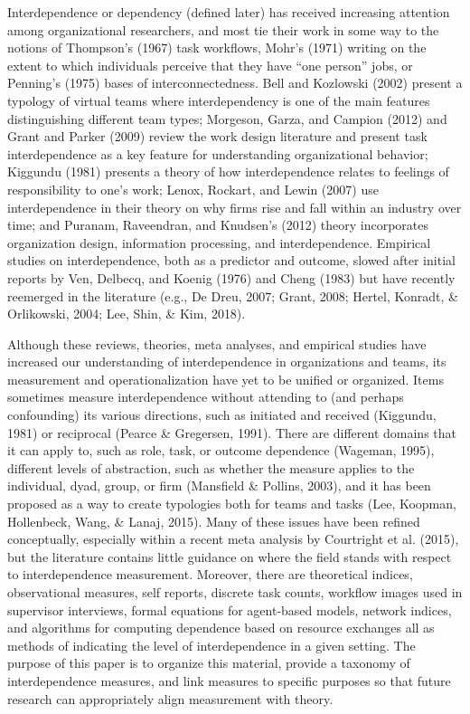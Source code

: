 \documentclass[english,,man]{apa6}
\theoremstyle{definition}
\theoremstyle{definition}
\theoremstyle{definition}
\theoremstyle{remark}
\begin{document}
Interdependence or dependency (defined later) has received increasing
attention among organizational researchers, and most tie their work in
some way to the notions of Thompson's (1967) task workflows, Mohr's
(1971) writing on the extent to which individuals perceive that they
have \enquote{one person} jobs, or Penning's (1975) bases of
interconnectedness. Bell and Kozlowski (2002) present a typology of
virtual teams where interdependency is one of the main features
distinguishing different team types; Morgeson, Garza, and Campion (2012)
and Grant and Parker (2009) review the work design literature and
present task interdependence as a key feature for understanding
organizational behavior; Kiggundu (1981) presents a theory of how
interdependence relates to feelings of responsibility to one's work;
Lenox, Rockart, and Lewin (2007) use interdependence in their theory on
why firms rise and fall within an industry over time; and Puranam,
Raveendran, and Knudsen's (2012) theory incorporates organization
design, information processing, and interdependence. Empirical studies
on interdependence, both as a predictor and outcome, slowed after
initial reports by Ven, Delbecq, and Koenig (1976) and Cheng (1983) but
have recently reemerged in the literature (e.g., De Dreu, 2007; Grant,
2008; Hertel, Konradt, \& Orlikowski, 2004; Lee, Shin, \& Kim, 2018).

Although these reviews, theories, meta analyses, and empirical studies
have increased our understanding of interdependence in organizations and
teams, its measurement and operationalization have yet to be unified or
organized. Items sometimes measure interdependence without attending to
(and perhaps confounding) its various directions, such as initiated and
received (Kiggundu, 1981) or reciprocal (Pearce \& Gregersen, 1991).
There are different domains that it can apply to, such as role, task, or
outcome dependence (Wageman, 1995), different levels of abstraction,
such as whether the measure applies to the individual, dyad, group, or
firm (Mansfield \& Pollins, 2003), and it has been proposed as a way to
create typologies both for teams and tasks (Lee, Koopman, Hollenbeck,
Wang, \& Lanaj, 2015). Many of these issues have been refined
conceptually, especially within a recent meta analysis by Courtright et
al. (2015), but the literature contains little guidance on where the
field stands with respect to interdependence measurement. Moreover,
there are theoretical indices, observational measures, self reports,
discrete task counts, workflow images used in supervisor interviews,
formal equations for agent-based models, network indices, and algorithms
for computing dependence based on resource exchanges all as methods of
indicating the level of interdependence in a given setting. The purpose
of this paper is to organize this material, provide a taxonomy of
interdependence measures, and link measures to specific purposes so that
future research can appropriately align measurement with theory.
\end{document}
